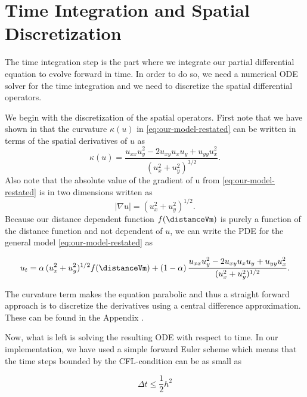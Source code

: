 \section{Time Integration and Spatial Discretization}
The time integration step is the part where we integrate our partial differential equation to evolve forward in time. In order to do so, we need a numerical ODE solver for the time integration and we need to discretize the spatial differential operators.

We begin with the discretization of the spatial operators. First note that we have shown in  that the curvature $\kappa(u)$ in \eqref{eq:our-model-restated} can be written in terms of the spatial derivatives of $u$ as 
\begin{equation*}
    \kappa(u) = \frac{u_{xx} u_y^2- 2u_{xy}u_xu_y + u_{yy}u_x^2}{(u_x^2+u_y^2)^{3/2}}.
\end{equation*}
Also note that the absolute value of the gradient of u from \eqref{eq:our-model-restated} is in two dimensions written as 
\begin{equation*}
    |\nabla u| = (u_x^2+u_y^2)^{1/2}.
\end{equation*}
Because our distance dependent function $f(\distanceVm)$ is purely a function of the distance function and not dependent of $u$, we can write the PDE for the general model \eqref{eq:our-model-restated} as

\begin{equation}
    u_t = \alpha\, (u_x^2+u_y^2)^{1/2} f(\distanceVm) + (1-\alpha)\, \frac{u_{xx} u_y^2- 2u_{xy}u_xu_y + u_{yy}u_x^2}{(u_x^2+u_y^2)^{1/2}}.
\end{equation}

The curvature term makes the equation parabolic and thus a straight forward approach is to discretize the derivatives using a central difference approximation. These can be found in the Appendix . 

Now, what is left is solving the resulting ODE with respect to time. In our implementation, we have used a simple forward Euler scheme which means that the time steps bounded by the CFL-condition can be as small as 


\begin{equation}
    \Delta t \leq \frac{1}{2} h^2
\end{equation}

\clearpage